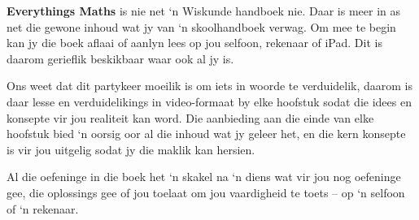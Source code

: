 \par
{\Large
% 
% 
% 
% 
% 

\textbf{Everythings Maths} is nie net ‘n Wiskunde handboek nie. Daar is meer in as net die gewone inhoud wat jy van ‘n skoolhandboek verwag. Om mee te begin kan jy die boek aflaai of aanlyn lees op jou selfoon, rekenaar of iPad. Dit is daarom gerieflik beskikbaar waar ook al jy is.\par

Ons weet dat dit partykeer moeilik is om iets in woorde te verduidelik, daarom is daar lesse en verduidelikings in video-formaat by elke hoofstuk sodat die idees en konsepte vir jou realiteit kan word. Die aanbieding aan die einde van elke hoofstuk bied ‘n oorsig oor al die inhoud wat jy geleer het, en die kern konsepte is vir jou uitgelig sodat jy die maklik kan hersien. \par

Al die oefeninge in die boek het ‘n skakel na ‘n diens wat vir jou nog oefeninge gee, die oplossings gee of jou toelaat om jou vaardigheid te toets – op ‘n selfoon of ‘n rekenaar. \par

}
